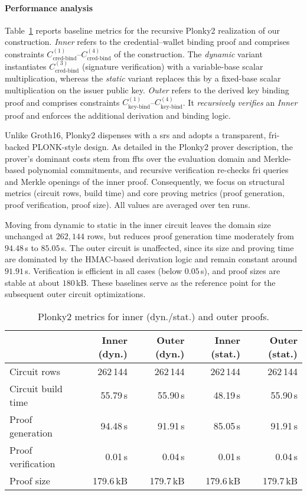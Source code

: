 \paragraph{Performance analysis}
Table~\ref{tab:plonky2-base} reports baseline metrics for the recursive Plonky2 realization of our construction. \emph{Inner} refers to the credential–wallet binding proof and comprises constraints $C_{\text{cred-bind}}^{(1)}$–$C_{\text{cred-bind}}^{(4)}$ of the construction. The \emph{dynamic} variant instantiates $C_{\text{cred-bind}}^{(3)}$ (signature verification) with a variable-base scalar multiplication, whereas the \emph{static} variant replaces this by a fixed-base scalar multiplication on the issuer public key. \emph{Outer} refers to the derived key binding proof and comprises constraints $C_{\text{key-bind}}^{(1)}$–$C_{\text{key-bind}}^{(4)}$. It \emph{recursively verifies} an \emph{Inner} proof and enforces the additional derivation and binding logic.

Unlike Groth16, Plonky2 dispenses with a \acrshort{srs} and adopts a transparent, \acrshort{fri}-backed PLONK-style design. As detailed in the Plonky2 prover description, the prover’s dominant costs stem from \acrshort{fft}s over the evaluation domain and Merkle-based polynomial commitments, and recursive verification re-checks \acrshort{fri} queries and Merkle openings of the inner proof. Consequently, we focus on structural metrics (circuit rows, build time) and core proving metrics (proof generation, proof verification, proof size). All values are averaged over ten runs.

Moving from dynamic to static in the inner circuit leaves the domain size unchanged at $262{,}144$ rows, but reduces proof generation time moderately from $94.48$\,s to $85.05$\,s. The outer circuit is unaffected, since its size and proving time are dominated by the HMAC-based derivation logic and remain constant around $91.91$\,s. Verification is efficient in all cases (below $0.05$\,s), and proof sizes are stable at about $180$\,kB. These baselines serve as the reference point for the subsequent outer circuit optimizations.

\begin{table}[t]
	\centering
	\begin{tabular}{lrrrr}
		\toprule
		& \textbf{Inner (dyn.)} & \textbf{Outer (dyn.)} & \textbf{Inner (stat.)} & \textbf{Outer (stat.)} \\
		\midrule
		Circuit rows        & 262\,144  & 262\,144  & 262\,144  & 262\,144 \\
		Circuit build time  & 55.79\,s  & 55.90\,s  & 48.19\,s  & 55.90\,s \\
		Proof generation    & 94.48\,s  & 91.91\,s  & 85.05\,s  & 91.91\,s \\
		Proof verification  & 0.01\,s   & 0.04\,s   & 0.01\,s   & 0.04\,s \\
		Proof size          & 179.6\,kB & 179.7\,kB & 179.6\,kB & 179.7\,kB \\
		\bottomrule
	\end{tabular}
	\caption{Plonky2 metrics for inner (dyn./stat.) and outer proofs.}
	\label{tab:plonky2-base}
\end{table}

